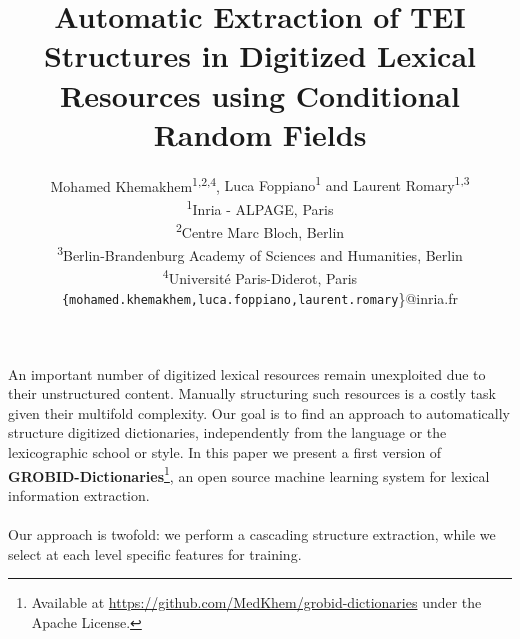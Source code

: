 \documentclass[twocolumn,a4paper]{article}
\newcommand*{\affaddr}[1]{#1} %
\newcommand*{\affmark}[1][*]{\textsuperscript{#1}}
\newcommand*{\email}[1]{\texttt{#1}}
\begin{document}
\title{Automatic Extraction of TEI Structures in Digitized Lexical Resources using Conditional Random Fields}  
\author{%
Mohamed Khemakhem\affmark[1,2,4], {Luca Foppiano\affmark[1] and Laurent Romary\affmark[1,3]\\
\affaddr{\affmark[1]Inria - ALPAGE, Paris}\\
\affaddr{\affmark[2]Centre Marc Bloch, Berlin}\\
\affaddr{\affmark[3]Berlin-Brandenburg Academy of Sciences and Humanities, Berlin}\\
\affaddr{\affmark[4]Université Paris-Diderot, Paris}\\

\email{\{mohamed.khemakhem,luca.foppiano,laurent.romary}\}@inria.fr}\\
}
\maketitle


\paragraph{}An important number of digitized lexical resources remain unexploited due to their unstructured content.
Manually structuring such resources is a costly task given their multifold complexity. 
Our goal is to find an approach to automatically structure digitized dictionaries, independently from the language or the lexicographic school or style. In this paper we present a first version of \textbf{GROBID-Dictionaries}\footnote{Available at \url{https://github.com/MedKhem/grobid-dictionaries} under the Apache License.}, an open source machine learning system for lexical information extraction.
 
\paragraph{} Our approach is twofold: we perform a cascading structure extraction, while we select at each level specific features for training.
\end{document}
